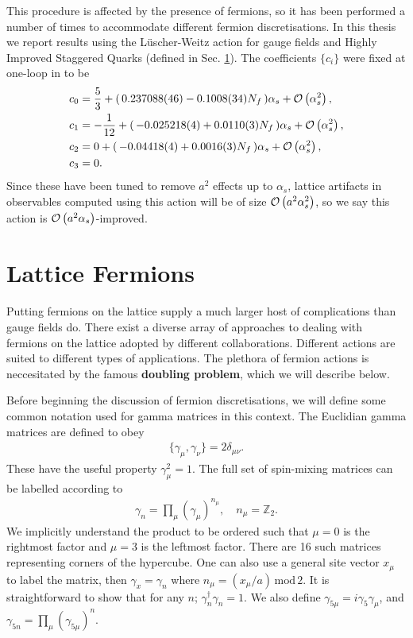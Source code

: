 This procedure is affected by the presence of fermions, so it has been performed a number of times to accommodate different fermion discretisations. In this thesis we report results using the L\"uscher-Weitz action for gauge fields and Highly Improved Staggered Quarks (defined in Sec. \ref{sec:fermions}). The coefficients $\{c_i\}$ were fixed at one-loop %
in \cite{Hart:2008sq} to be
\begin{align}
  c_0& = {5\over 3} + ( \,0.237088(46) - 0.1008(34) N_f \,) \alpha_s + \mathcal{O}\left( \alpha_s^2 \right),\\
  c_1& = -{1\over 12} + ( \,-0.025218(4) + 0.0110(3) N_f \,) \alpha_s + \mathcal{O}\left( \alpha_s^2 \right),\\
  c_2& = 0 + ( \,-0.04418(4) + 0.0016(3) N_f \,) \alpha_s + \mathcal{O}\left( \alpha_s^2 \right), \\
  c_3& = 0.
\end{align}
Since these have been tuned to remove $a^2$ effects up to $\alpha_s$, lattice artifacts in observables computed using this action will be of size $\mathcal{O}\left( a^2\alpha_s^2 \right)$, so we say this action is $\mathcal{O}\left( a^2\alpha_s \right)$-improved.

\section{Lattice Fermions}
\label{sec:fermions}

Putting fermions on the lattice supply a much larger host of complications than gauge fields do. There exist a diverse array of approaches to dealing with fermions on the lattice adopted by different collaborations. Different actions are suited to different types of applications. The plethora of fermion actions is neccesitated by the famous {\textbf{doubling problem}}, which we will describe below.


Before beginning the discussion of fermion discretisations, we will define some common notation used for gamma matrices in this context. The Euclidian gamma matrices are defined to obey
\begin{align}
  \{\gamma_{\mu},\gamma_{\nu}\} = 2\delta_{\mu\nu}.
\end{align}
These have the useful property $\gamma_{\mu}^2=1$. The full set of spin-mixing matrices can be labelled according to
\begin{align}
  \gamma_n = \prod_{\mu} \left( \gamma_{\mu} \right)^{n_{\mu}}, \quad n_{\mu} = \mathbb{Z}_2.
\end{align}
We implicitly understand the product to be ordered such that $\mu=0$ is the rightmost factor and $\mu=3$ is the leftmost factor. There are 16 such matrices representing corners of the hypercube. One can also use a general site vector $x_{\mu}$ to label the matrix, then $\gamma_x = \gamma_n$ where $n_{\mu} = (x_{\mu}/a)\,\text{mod}\,2$. It is straightforward to show that for any $n$; $\gamma_n^{\dagger} \gamma_n = 1$. We also define $\gamma_{5\mu} = i\gamma_5\gamma_{\mu}$, and $\gamma_{5n} = \prod_{\mu}(\gamma_{5\mu})^n$.

